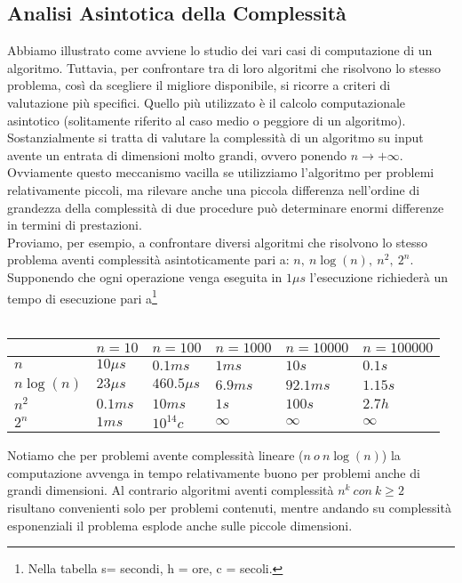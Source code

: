\subsection{Analisi Asintotica della Complessità}
Abbiamo illustrato come avviene lo studio dei vari casi di computazione di un algoritmo. Tuttavia, per confrontare tra di loro algoritmi che risolvono lo stesso problema, così da scegliere il migliore disponibile, si ricorre a criteri di valutazione più specifici. Quello più utilizzato è il calcolo computazionale asintotico (solitamente riferito al caso medio o peggiore di un algoritmo).\\
Sostanzialmente si tratta di valutare la complessità di un algoritmo su input avente un entrata di dimensioni molto grandi, ovvero ponendo $n \rightarrow +\infty$. Ovviamente questo meccanismo vacilla se utilizziamo l'algoritmo per problemi relativamente piccoli, ma rilevare anche una piccola differenza nell’ordine di grandezza della complessità di due procedure può determinare enormi differenze in termini di prestazioni.\\
Proviamo, per esempio, a confrontare diversi algoritmi che risolvono lo stesso problema aventi complessità asintoticamente pari a: $n, \ n\log(n), \ n^2, \ 2^n$. Supponendo che ogni operazione venga eseguita in $1\mu s$ l'esecuzione richiederà un tempo di esecuzione pari a\footnote{Nella tabella s= secondi, h = ore, c = secoli.}
\\
\\
\label{my-label}
\begin{tabular}{|l|l|l|l|l|l|}
\hline
			& $n=10$     & $n=100$       	& $n=1000$      & $n=10000$  & $n=100000$  \\   \hline
$n$   		& $10\mu s$  & $0.1 ms$      	&  $1ms$      	& $10s$  	 & $0.1s$      \\	\hline
$n\log(n)$  & $23\mu s$  & $460.5 \mu s$    &  $6.9 ms$     & $92.1 ms$  & $1.15 s$    \\	\hline
$n^2$ 		& $0.1ms$    & $10ms$        	&  $1s$         & $100s$     & $2.7h$      \\	\hline
$2^n$		& $1ms$      & $ 10^{14} c$     &  $\infty$     & $\infty$   & $\infty$    \\   \hline
\end{tabular}
Notiamo che per problemi avente complessità lineare ($n \ o \ n\log(n)$) la computazione avvenga in tempo relativamente buono per problemi anche di grandi dimensioni. Al contrario algoritmi aventi complessità $n^k \ con \ k \geq 2 $ risultano convenienti solo per problemi contenuti, mentre andando su complessità esponenziali il problema esplode anche sulle piccole dimensioni. 
